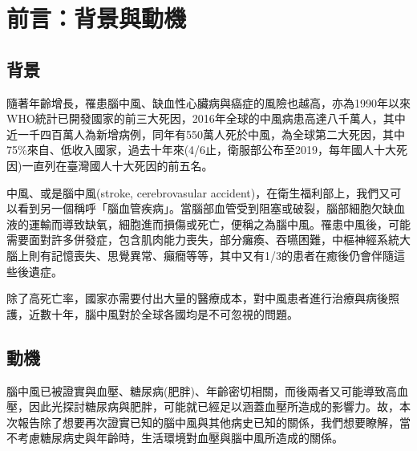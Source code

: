\chapter{前言：背景與動機}
\section{背景}
隨著年齡增長，罹患腦中風、缺血性心臟病與癌症的風險也越高，亦為1990年以來WHO統計已開發國家的前三大死因\cite{chu2018}，2016年全球的中風病患高達八千萬人，其中近一千四百萬人為新增病例，同年有550萬人死於中風，為全球第二大死因\cite{Johnson2019}，其中75\%來自、低收入國家\cite{Collaborators2018}，過去十年來(4/6止，衛服部公布至2019，每年國人十大死因)一直列在臺灣國人十大死因的前五名\cite{mhw2018,cdc2020}。

中風、或是腦中風(stroke, cerebrovasular accident)，在衛生福利部上，我們又可以看到另一個稱呼「腦血管疾病」。當腦部血管受到阻塞或破裂，腦部細胞欠缺血液的運輸而導致缺氧，細胞進而損傷或死亡，便稱之為腦中風\cite{Johnson2016}。罹患中風後，可能需要面對許多併發症，包含肌肉能力喪失，部分癱瘓、吞嚥困難，中樞神經系統大腦上則有記憶喪失、思覺異常、癲癇等等\cite{Langhorne2000, Kumar2010}，其中又有1/3的患者在癒後仍會伴隨這些後遺症\cite{Organization2021}。

除了高死亡率，國家亦需要付出大量的醫療成本，對中風患者進行治療與病後照護，近數十年，腦中風對於全球各國均是不可忽視的問題。

\section{動機}
腦中風已被證實與血壓、糖尿病(肥胖)、年齡密切相關\cite{Boehme2017}，而後兩者又可能導致高血壓，因此光探討糖尿病與肥胖，可能就已經足以涵蓋血壓所造成的影響力。故，本次報告除了想要再次證實已知的腦中風與其他病史已知的關係，我們想要瞭解，當不考慮糖尿病史與年齡時，生活環境對血壓與腦中風所造成的關係。
